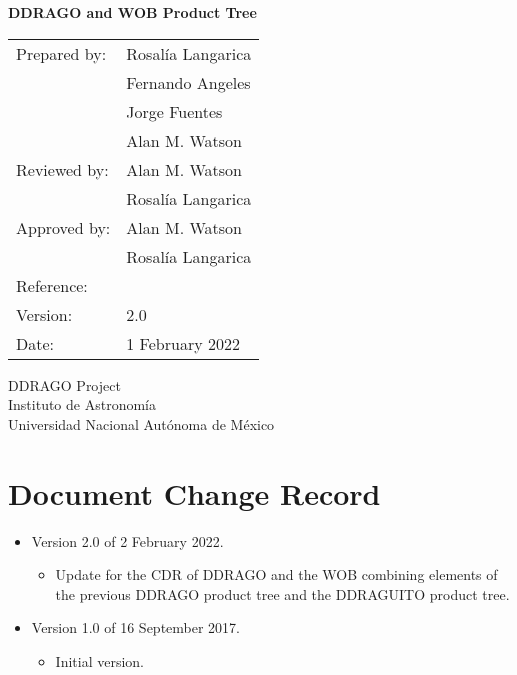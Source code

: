 \documentclass{article}
\begin{document}
\pagestyle{empty}

\begin{center}

{\Large \bfseries DDRAGO and WOB Product Tree}

\vspace{2cm}

\begin{tabular}{ll}
Prepared by:&Rosalía Langarica\\
&Fernando Angeles\\
&Jorge Fuentes\\
&Alan M. Watson\\
Reviewed by:&Alan M. Watson\\
&Rosalía Langarica\\
Approved by:&Alan M. Watson\\
&Rosalía Langarica\\
Reference:&\\
Version:& 2.0\\
Date:&1 February 2022\\
\end{tabular}

\vspace{\fill}

DDRAGO Project\\
Instituto de Astronomí­a\\
Universidad Nacional Autónoma de México

\end{center}

\newpage

\section*{Document Change Record}

\begin{itemize}

\item Version 2.0 of 2 February 2022.

\begin{itemize}
    \item Update for the CDR of DDRAGO and the WOB combining elements of the previous DDRAGO product tree and the DDRAGUITO product tree.
\end{itemize}

\item Version 1.0 of 16 September 2017.

\begin{itemize}
    \item Initial version.
\end{itemize}

\end{itemize}
\end{document}
